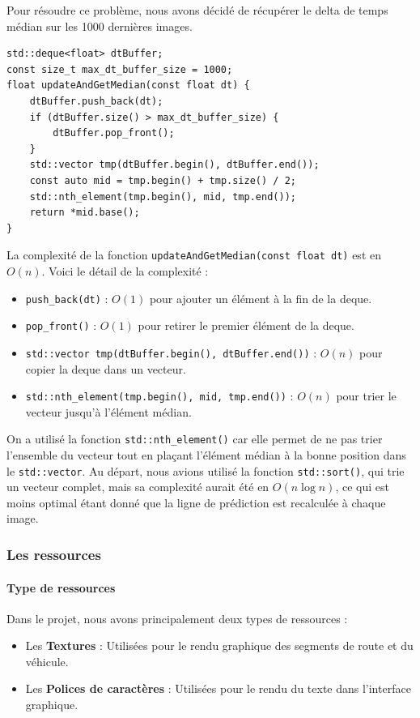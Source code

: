Pour résoudre ce problème, nous avons décidé de récupérer le delta de temps médian sur les 1000 dernières images.

\begin{lstlisting}[style=CStyle, label={lst:code_dequeue_dt}]
std::deque<float> dtBuffer;
const size_t max_dt_buffer_size = 1000;
float updateAndGetMedian(const float dt) {
    dtBuffer.push_back(dt);
    if (dtBuffer.size() > max_dt_buffer_size) {
        dtBuffer.pop_front();
    }
    std::vector tmp(dtBuffer.begin(), dtBuffer.end());
    const auto mid = tmp.begin() + tmp.size() / 2;
    std::nth_element(tmp.begin(), mid, tmp.end());
    return *mid.base();
}
\end{lstlisting}

La complexité de la fonction \texttt{updateAndGetMedian(const float dt)} est en \( O(n) \).
Voici le détail de la complexité :
\begin{itemize}
    \item \texttt{push\_back(dt)} : \( O(1) \)\cite{cpp_reference_push_back} pour ajouter un élément à la fin de la deque.
    \item \texttt{pop\_front()} : \( O(1) \)\cite{cpp_reference_pop_front} pour retirer le premier élément de la deque.
    \item \texttt{std::vector tmp(dtBuffer.begin(), dtBuffer.end())} : \( O(n) \)\cite{cpp_reference_vector} pour copier la deque dans un vecteur.
    \item \texttt{std::nth\_element(tmp.begin(), mid, tmp.end())} : \( O(n) \)\cite{cpp_reference_std_nth_element} pour trier le vecteur jusqu'à l'élément médian.
\end{itemize}

On a utilisé la fonction \texttt{std::nth\_element()}\cite{cpp_reference_std_nth_element} car elle permet de ne pas trier l'ensemble du vecteur tout en plaçant l'élément médian à la bonne position dans le \texttt{std::vector}\cite{cpp_reference_vector}.
Au départ, nous avions utilisé la fonction \texttt{std::sort()}, qui trie un vecteur complet, mais sa complexité aurait été en \( O(n \log n) \)\cite{cpp_reference_std_sort}, ce qui est moins optimal étant donné que la ligne de prédiction est recalculée à chaque image.


\subsubsection{Les ressources}\label{subsubsec:gestion-des-ressources}
\paragraph{Type de ressources}
Dans le projet, nous avons principalement deux types de ressources :
\begin{itemize}
    \item Les \textbf{Textures} : Utilisées pour le rendu graphique des segments de route et du véhicule.
    \item Les \textbf{Polices de caractères} : Utilisées pour le rendu du texte dans l'interface graphique.
\end{itemize}

